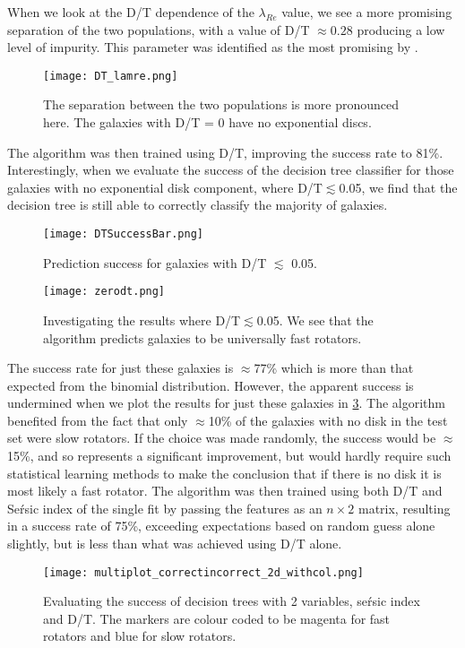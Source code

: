 When we look at the D/T dependence of the $\lambda_{Re}$ value, we see a more promising separation of the two populations, with a value of D/T $\approx 0.28$ producing a low level of impurity. This parameter was identified as the most promising by \cite{Krajnovic2013}.
\begin{figure}[ht]
	\centering
	\texttt{[image: DT\_lamre.png]}
	\caption{The separation between the two populations is more pronounced here. The galaxies with D/T = 0 have no exponential discs.
	}
	\label{fig:dtlamre}
\end{figure}
The algorithm was then trained using D/T, improving the success rate to 81\%. Interestingly, when we evaluate the success of the decision tree classifier for those galaxies with no exponential disk component, where D/T$\lesssim $0.05, we find that the decision tree is still able to correctly classify the majority of galaxies.
\begin{figure}[h!]
	\centering
	\texttt{[image: DTSuccessBar.png]}
	\caption{Prediction success for galaxies with D/T $\lesssim$ 0.05.}
	\label{fig:dtbar}
\end{figure}
\begin{figure}[h!]
	\centering
	\texttt{[image: zerodt.png]}
	\caption{Investigating the results where D/T$\lesssim $0.05. We see that the algorithm predicts galaxies to be universally fast rotators.
	}
	\label{fig:zerodt}
\end{figure}
The success rate for just these galaxies is $\approx$77\% which is more than that expected from the binomial distribution. However, the apparent success is undermined when we plot the results for just these galaxies in \ref{fig:zerodt}.
The algorithm benefited from the fact that only $\approx$10\% of the galaxies with no disk in the test set were slow rotators. If the choice was made randomly, the success would be $\approx$15\%, and so represents a significant improvement, but would hardly require such statistical learning methods to make the conclusion that if there is no disk it is most likely a fast rotator.
The algorithm was then trained using both D/T and Se\'rsic index of the single fit by passing the features as an $n\times 2$ matrix, resulting in a success rate of 75\%, exceeding expectations based on random guess alone slightly, but is less than what was achieved using D/T alone. 
\begin{figure}[h!]
	\centering
	\texttt{[image: multiplot\_correctincorrect\_2d\_withcol.png]}
	\caption{Evaluating the success of decision trees with 2 variables, se\'rsic index and D/T. The markers are colour coded to be magenta for fast rotators and blue for slow rotators.
	}
	\label{fig:correctvsincorrect}
\end{figure}
